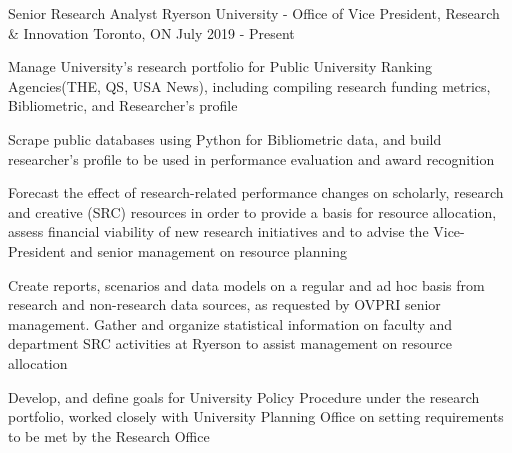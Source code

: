 

\begin{cventries}

  \cventry
    {Senior Research Analyst} %
    {Ryerson University - Office of Vice President, Research \& Innovation } %
    {Toronto, ON} %
    {July 2019 - Present} %
    {
      \begin{cvitems} %
        \item {Manage University’s research portfolio for Public University Ranking Agencies(THE, QS, USA News), including compiling research funding metrics, Bibliometric, and Researcher’s profile}
        \item {Scrape public databases using Python for Bibliometric data, and build researcher’s profile to be used in performance evaluation and award recognition}
        \item {Forecast the effect of research-related performance changes on scholarly, research and creative (SRC) resources in order to provide a basis for resource allocation, assess financial viability of new research initiatives and to advise the Vice-President and senior management on resource planning}
        \item{Create reports, scenarios and data models on a regular and ad hoc basis from research and non-research data sources, as requested by OVPRI senior management.  Gather and organize statistical information on faculty and department SRC activities at Ryerson to assist management on resource allocation}
        \item {Develop, and define goals for University Policy Procedure under the research portfolio, worked closely with University Planning Office on setting requirements to be met by the Research Office}
        {}
      \end{cvitems}
    }

 

\end{cventries}

